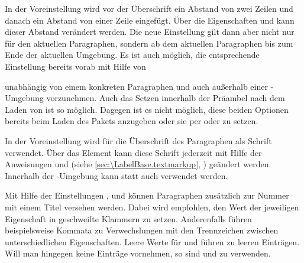 In der Voreinstellung wird vor der Überschrift ein
Abstand von zwei Zeilen und danach ein Abstand von einer Zeile eingefügt. Über
die Eigenschaften  und  kann dieser Abstand verändert
werden. Die neue Einstellung gilt dann aber nicht nur für den aktuellen
Paragraphen, sondern ab dem aktuellen Paragraphen bis zum Ende der aktuellen
Umgebung. Es ist auch möglich, die entsprechende Einstellung bereits vorab mit
Hilfe von
\begin{flushleft}\quad\small
  \textbf{}%
\end{flushleft}
unabhängig von einem konkreten Paragraphen und auch außerhalb einer
-Umgebung vorzunehmen. Auch das Setzen
innerhalb der Präambel nach dem Laden von  ist so
möglich. Dagegen ist es nicht möglich, diese beiden Optionen bereits beim
Laden des Pakets anzugeben oder sie per 
oder  zu setzen.

%
%
In der Voreinstellung wird für die Überschrift des
Paragraphen als Schrift 
verwendet. Über das Element
 kann
diese Schrift jederzeit mit Hilfe der Anweisungen
%
 und
 (siehe
\autoref{sec:\LabelBase.textmarkup}, )
geändert werden. Innerhalb der -Umgebung kann
statt  auch
 verwendet werden.%
%

Mit Hilfe der Einstellungen ,  und 
können Paragraphen zusätzlich zur Nummer mit einem Titel versehen
werden. Dabei wird empfohlen, den Wert der jeweiligen
Eigenschaft in geschweifte Klammern zu setzen. Anderenfalls führen
beispielsweise Kommata zu Verwechslungen mit den Trennzeichen zwischen
unterschiedlichen Eigenschaften. Leere Werte für  und
 führen zu leeren Einträgen. Will man hingegen keine Einträge
vornehmen, so sind  und  zu verwenden.

